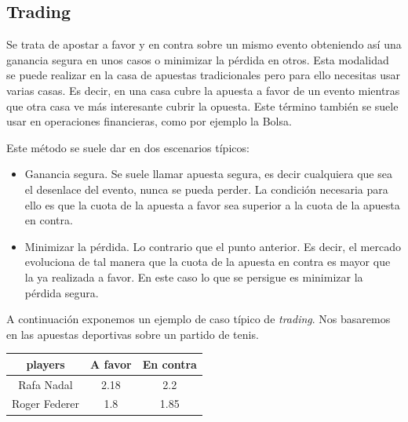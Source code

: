  
 \subsection{Trading}
 
 Se trata de apostar a favor y en contra sobre un mismo evento obteniendo así una ganancia segura en unos casos o minimizar la pérdida en otros.  Esta modalidad se puede realizar en la casa de apuestas tradicionales pero para ello necesitas usar varias casas. Es decir, en una casa cubre la apuesta a favor de un evento mientras que otra casa ve más interesante cubrir la opuesta. Este término también se suele usar en operaciones financieras, como por ejemplo la Bolsa.
  
  
  Este método se suele dar en dos escenarios típicos:
  
  
\begin{itemize}
	\item Ganancia segura.
	  Se suele llamar apuesta segura, es decir cualquiera que sea el desenlace del evento, nunca se pueda perder. La condición necesaria para ello es que la cuota de la apuesta a favor sea superior a la cuota de la apuesta en contra. 
	\item Minimizar la pérdida.
	   Lo contrario que el punto anterior. Es decir, el mercado evoluciona de tal manera que la cuota de la apuesta en contra es mayor que la ya realizada a favor. En este caso lo que se persigue es minimizar la pérdida segura.
\end{itemize}


A continuación exponemos un ejemplo de caso típico de \emph{trading}.
 Nos basaremos en las apuestas deportivas sobre un partido de tenis.
 
 \begin{center}
    \begin{tabular}{| c | c | c |}
      \hline
      \hline
      players & A favor & En contra\\
      \hline
      \hline
      Rafa Nadal & 2.18 & 2.2\\
      \hline
      \hline
      Roger Federer & 1.8 & 1.85\\
      \hline
      \hline
    \end{tabular}
  \end{center}

